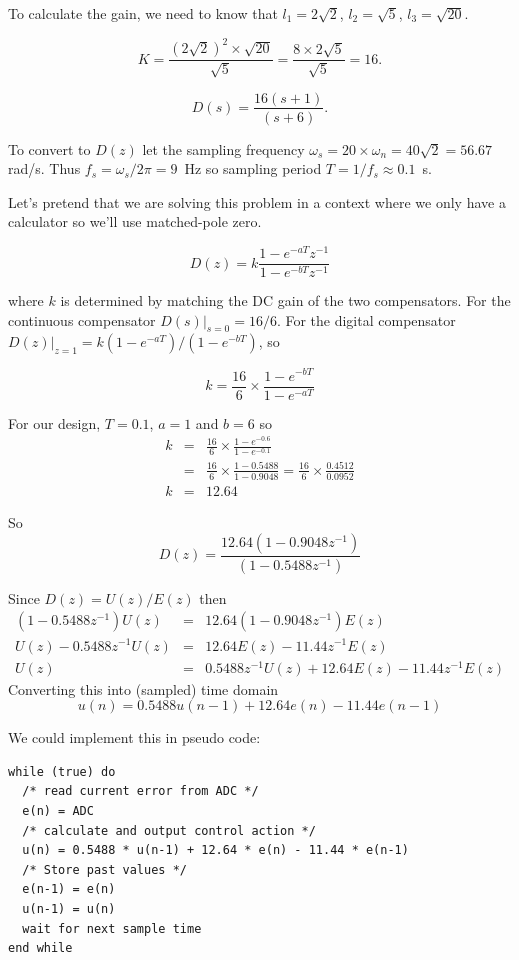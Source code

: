 To calculate the gain, we need to know that $l_1=2\sqrt{2}$, $l_2=\sqrt{5}$, $l_3=\sqrt{20}$.

$$K = \frac{(2\sqrt{2})^2\times \sqrt{20}}{\sqrt{5}} = \frac{8\times 2\sqrt{5}}{\sqrt{5}} = 16.$$

$$D(s) = \frac{16(s+1)}{(s+6)}.$$

To convert to $D(z)$ let the sampling frequency $\omega_s=20\times \omega_n = 40\sqrt{2}=56.67$ rad/s. Thus $f_s=\omega_s/2\pi = 9$~Hz so sampling period $T = 1/f_s \approx 0.1$~s.

Let's pretend that we are solving this problem in a context where we only have a calculator so we'll use matched-pole zero.

$$D(z)=k\frac{1-e^{-aT}z^{-1}}{1-e^{-bT}z^{-1}}$$

where $k$ is determined by matching the DC gain of the two compensators. For the continuous compensator $D(s)|_{s=0} = 16/6$. For the digital compensator $D(z)|_{z=1} = k(1-e^{-aT})/(1-e^{-bT})$, so

$$k=\frac{16}{6}\times\frac{1-e^{-bT}}{1-e^{-aT}}$$

For our design, $T=0.1$, $a=1$ and $b=6$ so 
\begin{eqnarray*}
	k & = & \frac{16}{6}\times\frac{1-e^{-0.6}}{1-e^{-0.1}} \\
	&= & \frac{16}{6}\times\frac{1-0.5488}{1-0.9048} = \frac{16}{6}\times\frac{0.4512}{0.0952}  \\
	k & = & 12.64
\end{eqnarray*}	

So $$D(z) = \frac{12.64(1-0.9048z^{-1})}{(1-0.5488z^{-1})}$$

Since $D(z)=U(z)/E(z)$ then 
\begin{eqnarray*}
	(1-0.5488z^{-1})U(z) & = & 12.64(1-0.9048z^{-1})E(z) \\
	U(z) - 0.5488z^{-1}U(z) & = & 12.64 E(z) - 11.44 z^{-1} E(z) \\
	U(z) & = & 0.5488z^{-1}U(z) + 12.64 E(z) - 11.44 z^{-1} E(z)
\end{eqnarray*}	
Converting this into (sampled) time domain
$$u(n) = 0.5488 u(n-1) + 12.64 e(n) - 11.44 e(n-1)$$

We could implement this in pseudo code:
\begin{verbatim}
while (true) do
  /* read current error from ADC */
  e(n) = ADC 
  /* calculate and output control action */
  u(n) = 0.5488 * u(n-1) + 12.64 * e(n) - 11.44 * e(n-1)
  /* Store past values */
  e(n-1) = e(n)
  u(n-1) = u(n)
  wait for next sample time
end while
\end{verbatim}

